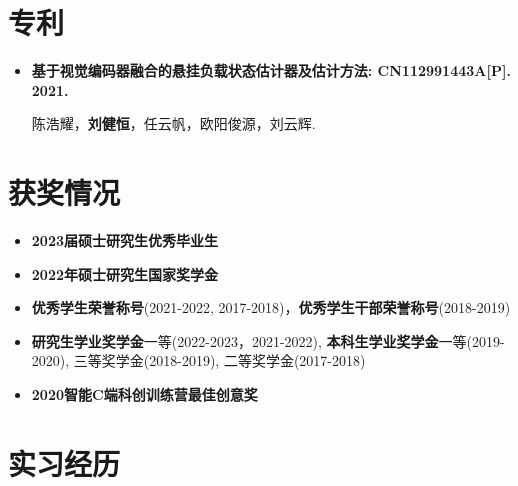 \documentclass[11pt,a4paper,sans]{moderncv}        %
\begin{document}
\section{专利}

\begin{itemize}

    \item{\textbf{基于视觉编码器融合的悬挂负载状态估计器及估计方法: CN112991443A[P]. 2021.}

    \small{陈浩耀，\textbf{刘健恒}，任云帆，欧阳俊源，刘云辉.}
    }
    
\end{itemize}

\section{获奖情况}

\begin{itemize}


\item{\textbf{2023届硕士研究生优秀毕业生}}

\item{\textbf{2022年硕士研究生国家奖学金}}

\item{\textbf{优秀学生荣誉称号}(2021-2022, 2017-2018)，\textbf{优秀学生干部荣誉称号}(2018-2019)}

\item{\textbf{研究生学业奖学金}一等(2022-2023，2021-2022), \textbf{本科生学业奖学金}一等(2019-2020), 三等奖学金(2018-2019), 二等奖学金(2017-2018)}

\item{\textbf{2020智能C端科创训练营最佳创意奖}}




\end{itemize}

\section{实习经历}
\end{document}
